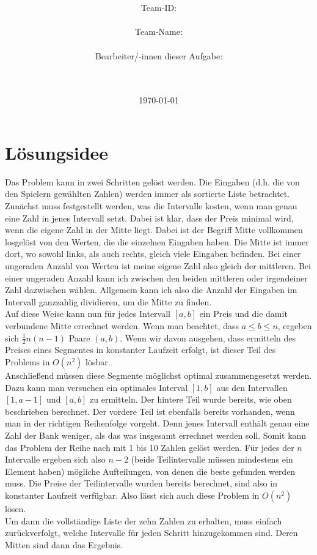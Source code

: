 \documentclass[a4paper,10pt,ngerman]{scrartcl}
\title{\textbf{\Huge\Aufgabe}}
\author{\LARGE Team-ID: \LARGE \TeamID \\\\
	    \LARGE Team-Name: \LARGE \TeamName \\\\
	    \LARGE Bearbeiter/-innen dieser Aufgabe: \\ 
	    \LARGE \Namen\\\\}
\date{\LARGE\today}
\begin{document}
\maketitle
\tableofcontents

\vspace{0.5cm}

\section{Lösungsidee}
Das Problem kann in zwei Schritten gel\"ost werden. Die Eingaben (d.h. die
von den Spielern gew\"ahlten Zahlen) werden immer als sortierte Liste betrachtet.\\
\indent Zun\"achst muss festgestellt werden, was die Intervalle kosten, wenn man
genau eine Zahl in jenes Intervall setzt. Dabei ist klar, dass der Preis minimal
wird, wenn die eigene Zahl in der Mitte liegt.
 Dabei ist der Begriff Mitte vollkommen losgel\"ost von den
Werten, die die einzelnen Eingaben haben. Die Mitte ist
immer dort, wo sowohl links, als auch rechts, gleich viele Eingaben befinden. 
Bei einer ungeraden Anzahl von Werten ist meine eigene Zahl also gleich der
mittleren. Bei einer ungeraden Anzahl kann ich zwischen den beiden mittleren
oder irgendeiner Zahl dazwischen w\"ahlen. Allgemein kann ich also die Anzahl der
Eingaben im Intervall ganzzahlig dividieren, um die Mitte zu finden.\\
\indent Auf diese Weise kann nun f\"ur jedes Intervall $[a, b]$ ein Preis und
die damit verbundene Mitte errechnet werden. Wenn man beachtet, dass $a \leq b \leq n$,
ergeben sich $\frac{1}{2}n(n-1)$ Paare $(a, b)$. Wenn wir davon ausgehen, dass
ermitteln des Preises eines Segmentes in konstanter Laufzeit erfolgt, ist dieser
Teil des Problems in $O(n^2)$ l\"osbar.\\
\indent Anschlie\ss end m\"ussen diese Segmente m\"oglichst optimal zusammengesetzt
werden. Dazu kann man versuchen ein optimales Interval $[1, b]$ aus den Intervallen $[1, a-1]$
und $[a, b]$ zu ermitteln. Der hintere Teil wurde bereits, wie oben beschrieben
berechnet. Der vordere Teil ist ebenfalls bereits vorhanden, wenn man in der
richtigen Reihenfolge vorgeht. Denn jenes Intervall enth\"alt genau eine Zahl 
der Bank weniger, als das was insgesamt errechnet werden soll. Somit kann das Problem
der Reihe nach mit 1 bis 10 Zahlen gel\"ost werden. F\"ur jedes der $n$ Intervalle
ergeben sich also $n-2$ (beide Teilintervalle m\"ussen mindestens ein Element haben)
m\"ogliche Aufteilungen, von denen die beste gefunden werden muss. Die Preise der
Teilintervalle wurden bereits berechnet, sind also in konstanter Laufzeit verf\"ugbar.
Also l\"asst sich auch diese Problem in $O(n^2)$ l\"osen.\\
\indent Um dann die vollst\"andige Liste der zehn Zahlen zu erhalten, muss einfach
zur\"uckverfolgt, welche Intervalle f\"ur jeden Schritt hinzugekommen sind. Deren
Mitten sind dann das Ergebnis.
\end{document}
